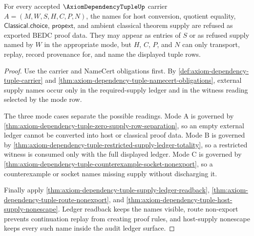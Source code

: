 \begin{theorem}
\label{thm:axiom-dependency-tuple-external-supply-refusal}
For every accepted $\AxiomDependencyTupleUp$ carrier
$A=(M,W,S,H,C,P,N)$, the names for host conversion, quotient equality,
$\mathsf{Classical.choice}$, $\mathsf{propext}$, and ambient classical theorem
supply are refused as exported BEDC proof data. They may appear as entries of
$S$ or as refused supply named by $W$ in the appropriate mode, but $H$, $C$,
$P$, and $N$ can only transport, replay, record provenance for, and name the
displayed tuple rows.
\end{theorem}
\begin{proof}
Use the carrier and NameCert obligations first. By
\autoref{def:axiom-dependency-tuple-carrier} and
\autoref{thm:axiom-dependency-tuple-namecert-obligations}, external supply
names occur only in the required-supply ledger and in the witness reading
selected by the mode row.

The three mode cases separate the possible readings. Mode A is governed by
\autoref{thm:axiom-dependency-tuple-zero-supply-row-separation}, so an empty
external ledger cannot be converted into host or classical proof data. Mode B
is governed by
\autoref{thm:axiom-dependency-tuple-restricted-supply-ledger-totality}, so a
restricted witness is consumed only with the full displayed ledger. Mode C is
governed by
\autoref{thm:axiom-dependency-tuple-counterexample-socket-nonexport}, so a
counterexample or socket names missing supply without discharging it.

Finally apply \autoref{thm:axiom-dependency-tuple-supply-ledger-readback},
\autoref{thm:axiom-dependency-tuple-route-nonexport}, and
\autoref{thm:axiom-dependency-tuple-host-supply-nonescape}. Ledger readback
keeps the names visible, route non-export prevents continuation replay from
creating proof rules, and host-supply nonescape keeps every such name inside
the audit ledger surface.
\end{proof}

